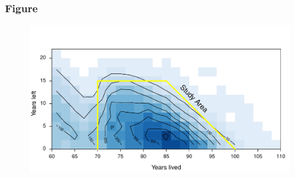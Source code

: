 \documentclass{beamer}
\begin{document}
\begin{frame}
\frametitle{Figure}

\begin{figure}
\includegraphics[width=0.8\linewidth]{Figures/CaseCountFemales}
\end{figure}
\end{frame}







\end{document}
